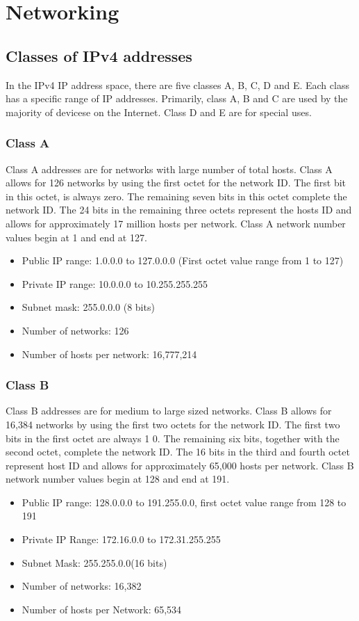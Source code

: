 \section{Networking}

\subsection{Classes of IPv4 addresses}
In the IPv4 IP address space, there are five classes A, B, C, D and E.
Each class has a specific range of IP addresses. Primarily, class A, B
and C are used by the majority of devicese on the Internet. Class D and
E are for special uses.

\subsubsection{Class A}
Class A addresses are for networks with large number of total hosts.
Class A allows for 126 networks by using the first octet for the network
ID. The first bit in this octet, is always zero. The remaining seven
bits in this octet complete the network ID. The 24 bits in the remaining
three octets represent the hosts ID and allows for approximately 17
million hosts per network. Class A network number values begin at 1 and
end at 127.
\begin{itemize}
\item Public IP range: 1.0.0.0 to 127.0.0.0 (First octet value range
from 1 to 127)
\item Private IP range: 10.0.0.0 to 10.255.255.255
\item Subnet mask: 255.0.0.0 (8 bits)
\item Number of networks: 126
\item Number of hosts per network: 16,777,214
\end{itemize}

\subsubsection{Class B}
Class B addresses are for medium to large sized networks. Class B allows
for 16,384 networks by using the first two octets for the network ID.
The first two bits in the first octet are always 1 0. The remaining six
bits, together with the second octet, complete the network ID. The 16
bits in the third and fourth octet represent host ID and allows for
approximately 65,000 hosts per network. Class B network number values
begin at 128 and end at 191.
\begin{itemize}
    \item Public IP range: 128.0.0.0 to 191.255.0.0, first octet value
        range from 128 to 191
    \item Private IP Range: 172.16.0.0 to 172.31.255.255
    \item Subnet Mask: 255.255.0.0(16 bits)
    \item Number of networks: 16,382
    \item Number of hosts per Network: 65,534
\end{itemize}

